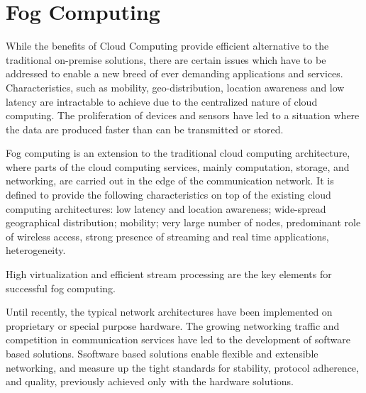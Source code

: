 \section{Fog Computing}
\label{section:fog-computing}




While the benefits of Cloud Computing provide efficient alternative to the traditional on-premise solutions, there are certain issues which have to be addressed to enable a new breed of ever demanding applications and services. Characteristics, such as mobility, geo-distribution, location awareness and low latency are intractable to achieve due to the centralized nature of cloud computing. The proliferation of devices and sensors have led to a situation where the data are produced faster than can be transmitted or stored.~\cite{Bonomi:2012:Fog, Vaquero:2014:FYW}

Fog computing is an extension to the traditional cloud computing architecture, where parts of the cloud computing services, mainly computation, storage, and networking, are carried out in the edge of the communication network. It is defined to provide the following characteristics on top of the existing cloud computing architectures: low latency and location awareness; wide-spread geographical distribution; mobility; very large number of nodes, predominant role of wireless access, strong presence of streaming and real time applications, heterogeneity.~\cite{Bonomi:2012:Fog}

High virtualization and efficient stream processing are the key elements for successful fog computing.

Until recently, the typical network architectures have been implemented on proprietary or special purpose hardware. The growing networking traffic and competition in communication services have led to the development of software based solutions. Ssoftware based solutions enable flexible and extensible networking, and measure up the tight standards for stability, protocol adherence, and quality, previously achieved only with the hardware solutions.~\cite{Kim:2013:SDN}


